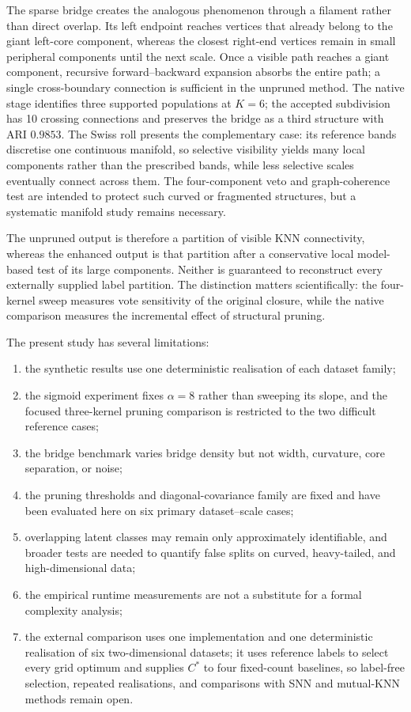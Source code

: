 \documentclass[pdflatex,sn-mathphys-num]{sn-jnl}
\begin{document}
The sparse bridge creates the analogous phenomenon through a filament rather
than direct overlap.  Its left endpoint reaches vertices that already belong
to the giant left-core component, whereas the closest right-end vertices remain
in small peripheral components until the next scale.  Once a visible path
reaches a giant component, recursive forward--backward expansion absorbs the
entire path; a single cross-boundary connection is sufficient in the unpruned method.
The native stage identifies three supported populations at $K=6$; the accepted
subdivision has 10 crossing connections and preserves the bridge as a third structure with ARI
$0.9853$.  The Swiss roll presents the complementary case: its reference bands
discretise one continuous manifold, so selective visibility yields many local
components rather than the prescribed bands, while less selective scales
eventually connect across them.  The four-component veto and graph-coherence
test are intended to protect such curved or fragmented structures, but a
systematic manifold study remains necessary.

The unpruned output is therefore a partition of visible KNN connectivity, whereas
the enhanced output is that partition after a conservative local model-based
test of its large components.  Neither is guaranteed to reconstruct every
externally supplied label partition.  The distinction matters scientifically:
the four-kernel sweep measures vote sensitivity of the original closure, while
the native comparison measures the incremental effect of structural pruning.

The present study has several limitations:
\begin{enumerate}
    \item the synthetic results use one deterministic realisation of each dataset family;
    \item the sigmoid experiment fixes $\alpha=8$ rather than sweeping its slope, and the focused three-kernel pruning comparison is restricted to the two difficult reference cases;
    \item the bridge benchmark varies bridge density but not width, curvature, core separation, or noise;
    \item the pruning thresholds and diagonal-covariance family are fixed and have been evaluated here on six primary dataset--scale cases;
    \item overlapping latent classes may remain only approximately identifiable, and broader tests are needed to quantify false splits on curved, heavy-tailed, and high-dimensional data;
    \item the empirical runtime measurements are not a substitute for a formal complexity analysis;
    \item the external comparison uses one implementation and one deterministic realisation of six two-dimensional datasets; it uses reference labels to select every grid optimum and supplies $C^*$ to four fixed-count baselines, so label-free selection, repeated realisations, and comparisons with SNN and mutual-KNN methods remain open.
\end{enumerate}
\end{document}
